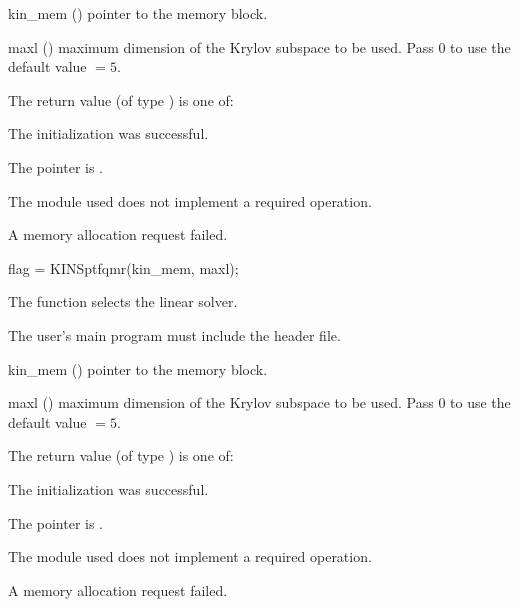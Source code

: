 {
  \begin{args}
  \item[kin\_mem] ()
    pointer to the {\kinsol} memory block.
  \item[maxl] ()
    maximum dimension of the Krylov subspace to be used. Pass $0$ to use the 
    default value $=5$.
  \end{args}
}
{
  The return value  (of type ) is one of:
  \begin{args}
  \item[\Id{KINSPILS\_SUCCESS}] 
    The {\kinspbcg} initialization was successful.
  \item[\Id{KINSPILS\_MEM\_NULL}]
    The  pointer is .
  \item[\Id{KINSPILS\_ILL\_INPUT}]
    The {\nvector} module used does not implement a required operation.
  \item[\Id{KINSPILS\_MEM\_FAIL}]
    A memory allocation request failed.
  \end{args}
}
{}
{
  flag = KINSptfqmr(kin\_mem, maxl);
}
{
  The function  selects the {\kinsptfqmr} linear solver.

  The user's main program must include the  header file.
}
{
  \begin{args}
  \item[kin\_mem] ()
    pointer to the {\kinsol} memory block.
  \item[maxl] ()
    maximum dimension of the Krylov subspace to be used. Pass $0$ to use the 
    default value $=5$.
  \end{args}
}
{
  The return value  (of type ) is one of:
  \begin{args}
  \item[\Id{KINSPILS\_SUCCESS}] 
    The {\kinsptfqmr} initialization was successful.
  \item[\Id{KINSPILS\_MEM\_NULL}]
    The  pointer is .
  \item[\Id{KINSPILS\_ILL\_INPUT}]
    The {\nvector} module used does not implement a required operation.
  \item[\Id{KINSPILS\_MEM\_FAIL}]
    A memory allocation request failed.
  \end{args}
}
{}

